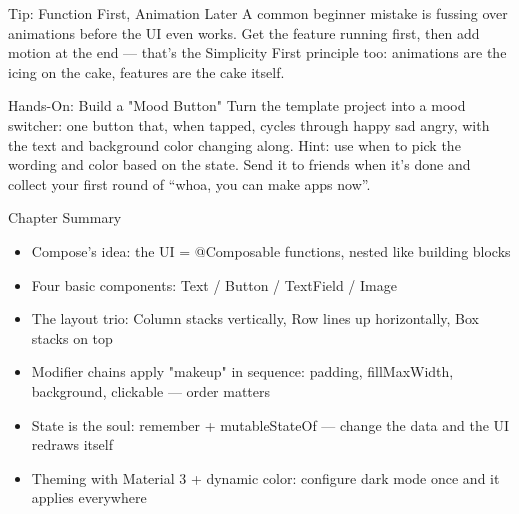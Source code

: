 \begin{tcbinfo}{Tip: Function First, Animation Later}
A common beginner mistake is fussing over animations before the UI even works. Get the feature running first, then add motion at the end — that's the Simplicity First principle too: animations are the icing on the cake, features are the cake itself.

\end{tcbinfo}

\begin{tcbpractice}{Hands-On: Build a "Mood Button"}
Turn the template project into a mood switcher: one button that, when tapped, cycles through happy sad angry, with the text and background color changing along. Hint: use when to pick the wording and color based on the state. Send it to friends when it's done and collect your first round of “whoa, you can make apps now”.

\end{tcbpractice}

\begin{tcbsummary}{Chapter Summary}
\begin{itemize}
  \item Compose's idea: the UI = @Composable functions, nested like building blocks
  \item Four basic components: Text / Button / TextField / Image
  \item The layout trio: Column stacks vertically, Row lines up horizontally, Box stacks on top
  \item Modifier chains apply "makeup" in sequence: padding, fillMaxWidth, background, clickable — order matters
  \item State is the soul: remember + mutableStateOf — change the data and the UI redraws itself
  \item Theming with Material 3 + dynamic color: configure dark mode once and it applies everywhere
\end{itemize}

\end{tcbsummary}
